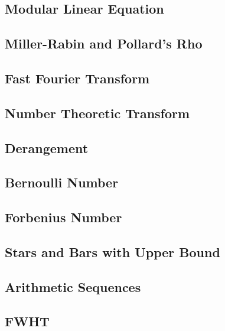 \subsection{Modular Linear Equation}

\subsection{Miller-Rabin and Pollard's Rho}

\subsection{Fast Fourier Transform}

\subsection{Number Theoretic Transform}

\subsection{Derangement}

\subsection{Bernoulli Number}

\subsection{Forbenius Number}

\subsection{Stars and Bars with Upper Bound}

\subsection{Arithmetic Sequences}

\subsection{FWHT}

